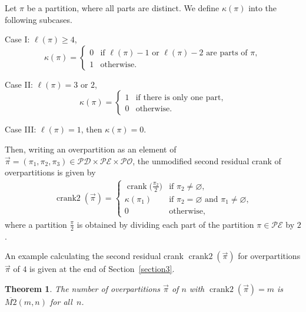 \documentclass[pdftex]{sigma}
\numberwithin{equation}{section}
\newtheorem{Theorem}{Theorem}[section]
\newcommand\mylabel[1]{\label{#1}}
\begin{document}
\begin{Definition}
\mylabel{def:crank2}
Let $\pi$ be a partition, where all parts are distinct. We define $\kappa(\pi)$ into the following subcases.

Case I: $\ell(\pi) \geq 4$,
\begin{equation*}
\kappa(\pi)=\begin{cases}
0 & \mbox{if $\ell(\pi)-1$ or $\ell(\pi)-2$ are parts of $\pi$}, \\
1 & \mbox{otherwise.}
\end{cases}
\end{equation*}

Case II: $\ell(\pi) = 3$ or $2$,
\begin{equation*}
\kappa(\pi)=\begin{cases}
1 & \mbox{if there is only one part},
\\
0 & \mbox{otherwise.}
\end{cases}
\end{equation*}

Case III: $\ell(\pi) = 1$, then $\kappa(\pi)=0$.

Then, writing an overpartition as an element of $\vec{\pi}=(\pi_1,\pi_2,\pi_3) \in \mathcal{PD} \times \mathcal{PE} \times \mathcal{PO}$, the unmodified second residual crank of overpartitions is given by
\begin{align}
\mylabel{eq:crank2}
\operatorname{crank2}(\vec{\pi})=\begin{cases}
\operatorname{crank}\bigl(\frac{\pi_2}{2}\bigr) & \mbox{if $\pi_2 \neq \varnothing$},
\\
\kappa(\pi_1) & \mbox{if $\pi_2 = \varnothing$  and $\pi_1 \neq \varnothing$,}
\\
0 & \mbox{otherwise},
\end{cases}
\end{align}
where a partition $\frac{\pi}{2}$ is obtained by dividing each part of the partition $\pi \in \mathcal{PE}$ by $2$.
\end{Definition}
An example calculating the second residual crank $\operatorname{crank2}(\vec{\pi})$ for overpartitions $\vec{\pi}$ of $4$ is given at the end of Section~\ref{section3}.

\begin{Theorem}
\mylabel{thm:M2}
The number of overpartitions $\vec{\pi}$ of $n$ with $\operatorname{crank2}(\vec{\pi})=m$ is $\overline{M2}(m,n)$ for all~$n$.
\end{Theorem}
\end{document}
